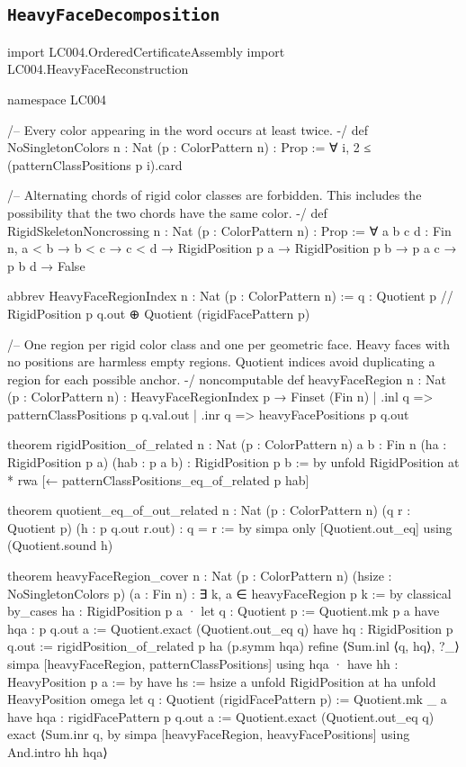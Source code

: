 \documentclass[11pt,reqno]{amsart}
\theoremstyle{definition}
\begin{document}
\subsection{\texorpdfstring{\texttt{HeavyFaceDecomposition}}{HeavyFaceDecomposition}}
\begin{LeanCode}
import LC004.OrderedCertificateAssembly
import LC004.HeavyFaceReconstruction

namespace LC004

/-- Every color appearing in the word occurs at least twice. -/
def NoSingletonColors {n : Nat} (p : ColorPattern n) : Prop :=
  ∀ i, 2 ≤ (patternClassPositions p i).card

/-- Alternating chords of rigid color classes are forbidden. This includes
the possibility that the two chords have the same color. -/
def RigidSkeletonNoncrossing {n : Nat} (p : ColorPattern n) : Prop :=
  ∀ a b c d : Fin n, a < b → b < c → c < d →
    RigidPosition p a → RigidPosition p b → p a c → p b d → False

abbrev HeavyFaceRegionIndex {n : Nat} (p : ColorPattern n) :=
  {q : Quotient p // RigidPosition p q.out} ⊕ Quotient (rigidFacePattern p)

/-- One region per rigid color class and one per geometric face. Heavy
faces with no positions are harmless empty regions. Quotient indices avoid
duplicating a region for each possible anchor. -/
noncomputable def heavyFaceRegion {n : Nat} (p : ColorPattern n) :
    HeavyFaceRegionIndex p → Finset (Fin n)
  | .inl q => patternClassPositions p q.val.out
  | .inr q => heavyFacePositions p q.out

theorem rigidPosition_of_related {n : Nat} (p : ColorPattern n)
    {a b : Fin n} (ha : RigidPosition p a) (hab : p a b) : RigidPosition p b := by
  unfold RigidPosition at *
  rwa [← patternClassPositions_eq_of_related p hab]

theorem quotient_eq_of_out_related {n : Nat} (p : ColorPattern n)
    (q r : Quotient p) (h : p q.out r.out) : q = r := by
  simpa only [Quotient.out_eq] using (Quotient.sound h)

theorem heavyFaceRegion_cover {n : Nat} (p : ColorPattern n)
    (hsize : NoSingletonColors p) (a : Fin n) :
    ∃ k, a ∈ heavyFaceRegion p k := by
  classical
  by_cases ha : RigidPosition p a
  · let q : Quotient p := Quotient.mk p a
    have hqa : p q.out a := Quotient.exact (Quotient.out_eq q)
    have hq : RigidPosition p q.out := rigidPosition_of_related p ha (p.symm hqa)
    refine ⟨Sum.inl ⟨q, hq⟩, ?_⟩
    simpa [heavyFaceRegion, patternClassPositions] using hqa
  · have hh : HeavyPosition p a := by
      have hs := hsize a
      unfold RigidPosition at ha
      unfold HeavyPosition
      omega
    let q : Quotient (rigidFacePattern p) := Quotient.mk _ a
    have hqa : rigidFacePattern p q.out a := Quotient.exact (Quotient.out_eq q)
    exact ⟨Sum.inr q, by simpa [heavyFaceRegion, heavyFacePositions] using And.intro hh hqa⟩


\end{LeanCode}
\end{document}
